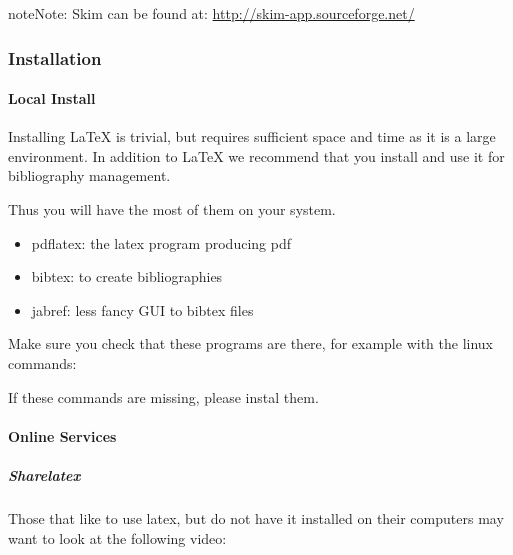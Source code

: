 \begin{sphinxadmonition}{note}{Note:}
Skim can be found at: \url{http://skim-app.sourceforge.net/}
\end{sphinxadmonition}


\subsubsection{Installation}
\label{\detokenize{lesson/doc/latex:installation}}

\paragraph{Local Install}
\label{\detokenize{lesson/doc/latex:local-install}}
Installing LaTeX is trivial, but requires sufficient space and time as
it is a large environment. In addition to LaTeX we recommend that you
install  and use it for bibliography management.

Thus you will have the most of them on your system.
\begin{itemize}
\item {} 
pdflatex: the latex program producing pdf

\item {} 
bibtex: to create bibliographies

\item {} 
jabref: less fancy GUI to bibtex files

\end{itemize}

Make sure you check that these programs are there, for example with
the linux commands:

\begin{sphinxVerbatim}[commandchars=\\\{\}]
 
 
          
\end{sphinxVerbatim}

If these commands are missing, please instal them.


\paragraph{Online Services}
\label{\detokenize{lesson/doc/latex:online-services}}

\subparagraph{Sharelatex}
\label{\detokenize{lesson/doc/latex:sharelatex}}
Those that like to use latex, but do not have it installed on their
computers may want to look at the following video:

